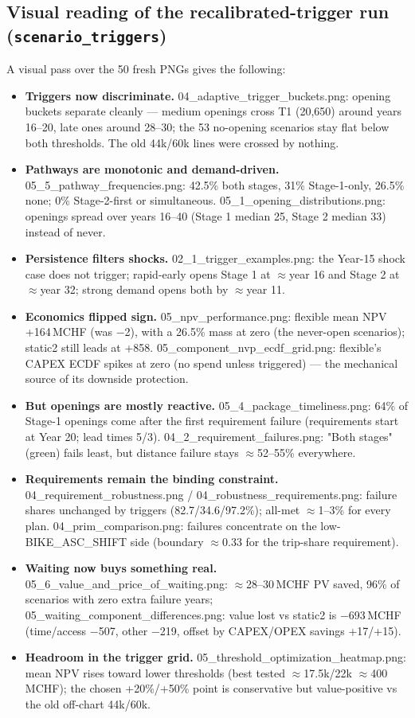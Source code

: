 \documentclass[10pt,a4paper]{article}
\begin{document}
\subsection{Visual reading of the recalibrated-trigger run (\texttt{scenario\_triggers})}
A visual pass over the 50 fresh PNGs gives the following:
\begin{itemize}
\item \textbf{Triggers now discriminate.} 04\_adaptive\_trigger\_buckets.png: opening buckets separate cleanly --- medium openings cross T1 (20{,}650) around years 16--20, late ones around 28--30; the 53 no-opening scenarios stay flat below both thresholds. The old 44k/60k lines were crossed by nothing.
\item \textbf{Pathways are monotonic and demand-driven.} 05\_5\_pathway\_frequencies.png: 42.5\% both stages, 31\% Stage-1-only, 26.5\% none; 0\% Stage-2-first or simultaneous. 05\_1\_opening\_distributions.png: openings spread over years 16--40 (Stage 1 median 25, Stage 2 median 33) instead of never.
\item \textbf{Persistence filters shocks.} 02\_1\_trigger\_examples.png: the Year-15 shock case does not trigger; rapid-early opens Stage 1 at $\approx$year 16 and Stage 2 at $\approx$year 32; strong demand opens both by $\approx$year 11.
\item \textbf{Economics flipped sign.} 05\_npv\_performance.png: flexible mean NPV +164\,MCHF (was $-$2), with a 26.5\% mass at zero (the never-open scenarios); static2 still leads at +858. 05\_component\_nvp\_ecdf\_grid.png: flexible's CAPEX ECDF spikes at zero (no spend unless triggered) --- the mechanical source of its downside protection.
\item \textbf{But openings are mostly reactive.} 05\_4\_package\_timeliness.png: 64\% of Stage-1 openings come after the first requirement failure (requirements start at Year 20; lead times 5/3). 04\_2\_requirement\_failures.png: "Both stages" (green) fails least, but distance failure stays $\approx$52--55\% everywhere.
\item \textbf{Requirements remain the binding constraint.} 04\_requirement\_robustness.png / 04\_robustness\_requirements.png: failure shares unchanged by triggers (82.7/34.6/97.2\%); all-met $\approx$1--3\% for every plan. 04\_prim\_comparison.png: failures concentrate on the low-BIKE\_ASC\_SHIFT side (boundary $\approx$0.33 for the trip-share requirement).
\item \textbf{Waiting now buys something real.} 05\_6\_value\_and\_price\_of\_waiting.png: $\approx$28--30\,MCHF PV saved, 96\% of scenarios with zero extra failure years; 05\_waiting\_component\_differences.png: value lost vs static2 is $-$693\,MCHF (time/access $-$507, other $-$219, offset by CAPEX/OPEX savings +17/+15).
\item \textbf{Headroom in the trigger grid.} 05\_threshold\_optimization\_heatmap.png: mean NPV rises toward lower thresholds (best tested $\approx$17.5k/22k $\approx$400\,MCHF); the chosen +20\%/+50\% point is conservative but value-positive vs the old off-chart 44k/60k.
\end{itemize}
\end{document}
